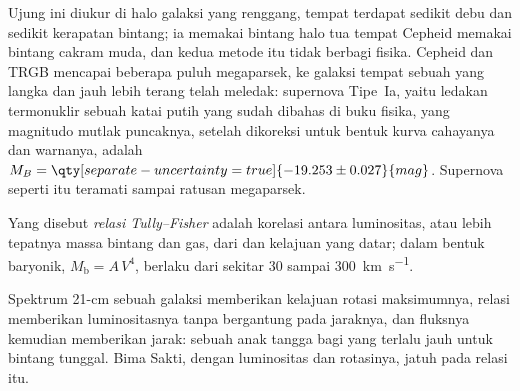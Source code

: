 Ujung ini diukur di halo galaksi yang renggang, tempat terdapat sedikit
debu dan sedikit kerapatan bintang; ia memakai bintang halo tua tempat Cepheid memakai
bintang cakram muda, dan kedua metode itu tidak berbagi fisika. Cepheid dan
TRGB mencapai beberapa puluh megaparsek, ke galaksi tempat sebuah  yang langka dan jauh
lebih terang telah meledak: supernova Tipe~Ia, yaitu ledakan
termonuklir sebuah katai putih yang sudah dibahas di buku fisika,
yang magnitudo mutlak puncaknya, setelah dikoreksi untuk
bentuk kurva cahayanya dan warnanya, adalah
$M_B = \qty[separate-uncertainty=true]{-19.253 \pm 0.027}{mag}$. Supernova seperti
itu teramati sampai ratusan megaparsek.

\begin{definition}\label{def:b3:milky-way-galaxies:tully-fisher}
Yang disebut \emph{relasi Tully--Fisher} adalah
korelasi antara luminositas, atau lebih tepatnya massa bintang dan gas,
dari  dan kelajuan  yang datar; dalam bentuk
baryonik, $M_\mathrm{b} = A\,V^4$, berlaku dari sekitar 30 sampai
\qty{300}{km.s^{-1}}.
\end{definition}

Spektrum 21-cm sebuah galaksi memberikan kelajuan rotasi maksimumnya, relasi
memberikan luminositasnya tanpa bergantung pada jaraknya, dan fluksnya
kemudian memberikan jarak: sebuah anak tangga bagi  yang terlalu jauh untuk
bintang tunggal. Bima Sakti, dengan luminositas dan rotasinya, jatuh pada relasi itu.

